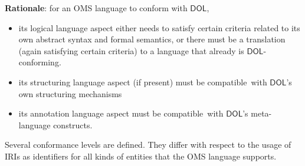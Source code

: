 \documentclass[10pt,fleqn,final]{scrreprt}
\makeatletter
\newcommand{\cbs}[0]{\color{red}\xspace} %
\newcommand{\cbe}[0]{\color{black}\xspace} %
\newcommand*\CommentAuthor{}
\renewcommand*\CommentAuthor{#1}}
\newcommand*\CommentDate{}
\renewcommand*\CommentDate{#1}}
\newcommand*\CommentId{}
\renewcommand*\CommentId{#1}}
\newcommand*\CommentType{}
\renewcommand*\CommentType{#1}}
\newcommand*{\SetCommentColorByType}[1]{%
\edef\localType{{#1}}%
\expandafter\ifstrequal\localType{q-aut}{\colorlet{CommentColor}{red}}{%
\expandafter\ifstrequal\localType{q-all}{\colorlet{CommentColor}{orange}}{%
\expandafter\ifstrequal\localType{todo}{\colorlet{CommentColor}{orange}}{%
\expandafter\ifstrequal\localType{fyi}{\colorlet{CommentColor}{lightgray}}{%
\colorlet{CommentColor}{yellow}}}}}}
\newcommand*{\SetCommentPrefixByType}[1]{%
\edef\localType{{#1}}%
\expandafter\@ifmtarg\localType{%
\edef\CommentPrefix{}%
}{%
\caseupper[q]{#1}%
\edef\CommentPrefix{\thestring: }%
}}
\newcommand*{\initComment}[1]{%
\setkeys{Comment}{#1}%
\SetCommentColorByType{\CommentType}%
\relax%
\SetCommentPrefixByType{\CommentType}%
\relax%
}
\newcommand*{\todonote}[2][]{%
\initComment{#1}%
\pdfcomment[author=\CommentAuthor,color=CommentColor,date=\CommentDate,id=\CommentId]{%
\CommentPrefix
#2}}
\renewcommand*{\todonote}[2][]{%
\initComment{#1}%
\ednote{\CommentPrefix #2}}
\newcommand*{\DOL}{\ensuremath{\mathsf{DOL}}\xspace}
\makeatother
\begin{document}
\begin{fminipage}{\textwidth}
\textbf{Rationale}: for an OMS language to conform with \DOL,
\begin{itemize}
\item its logical language aspect either needs to satisfy certain criteria \cbs related to its own abstract syntax and formal semantics\cbe, or there must be a translation (again satisfying certain
criteria) to a language that already is \DOL-conforming.
\item its structuring language aspect (if present) must \cbs be compatible\cbe\ with \DOL's own structuring
mechanisms
\item its annotation language aspect must \cbs be compatible\cbe\ with \DOL's meta-language constructs.
\end{itemize}
\cbs Several conformance levels are defined. They differ with respect \cbe{}to the usage of IRIs as identifiers for all kinds 
of entities that the OMS language supports.
\end{fminipage}


%
%
\end{document}
